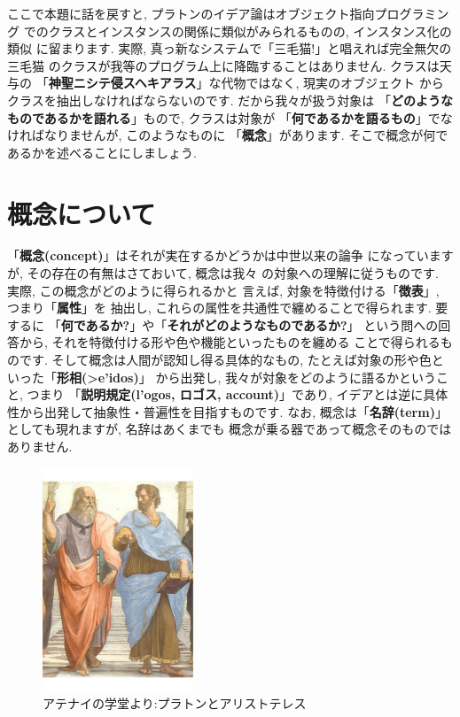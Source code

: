 \documentclass[b5j,8pt,twocolumn]{ltjsarticle}
\newcommand{\textgreek}[1]{\begingroup\fontencoding{LGR}\selectfont#1\endgroup}
\begin{document}
ここで本題に話を戻すと, プラトンのイデア論はオブジェクト指向プログラミング
でのクラスとインスタンスの関係に類似がみられるものの, インスタンス化の類似
に留まります. 実際, 真っ新なシステムで「三毛猫!」と唱えれば完全無欠の三毛猫
のクラスが我等のプログラム上に降臨することはありません. クラスは天与の
「\textbf{神聖ニシテ侵スヘキアラス}」な代物ではなく, 現実のオブジェクト
からクラスを抽出しなければならないのです. だから我々が扱う対象は
「\textbf{どのようなものであるかを語れる}」もので, クラスは対象が
「\textbf{何であるかを語るもの}」でなければなりませんが, このようなものに
「\textbf{概念}」があります. そこで概念が何であるかを述べることにしましょう.
\newpage

\section{概念について}

「\textbf{概念(concept)}」はそれが実在するかどうかは中世以来の論争
\cite{普遍論争}になっていますが, その存在の有無はさておいて, 概念は我々
の対象への理解に従うものです. 実際, この概念がどのように得られるかと
言えば, 対象を特徴付ける「\textbf{徴表}」, つまり「\textbf{属性}」を
抽出し, これらの属性を共通性で纏めることで得られます. 要するに
「\textbf{何であるか?}」や「\textbf{それがどのようなものであるか?}」
という問への回答から, それを特徴付ける形や色や機能といったものを纏める
ことで得られるものです. そして概念は人間が認知し得る具体的なもの,
 たとえば対象の形や色といった「\textbf{形相(\textgreek{>e'idos})}」
から出発し, 我々が対象をどのように語るかということ, つまり
「\textbf{説明規定(\textgreek{l'ogos}, ロゴス, account)}」であり,
 イデアとは逆に具体性から出発して抽象性・普遍性を目指すものです. なお,
 概念は「\textbf{名辞(term)}」としても現れますが, 名辞はあくまでも
概念が乗る器であって概念そのものではありません.
\newline

\begin{figure}
\includegraphics[width=4.5cm]{Plato_and_Aristotle_in_The_School_of_Athens,_by_italian_Rafael.pdf}
\caption{アテナイの学堂より:プラトンとアリストテレス}
\label{fig:Plato-Aristotle}
\end{figure}
\end{document}
